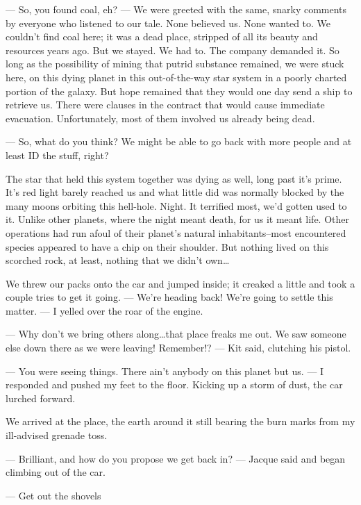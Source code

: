 \sepline

--- So, you found coal, eh? --- We were greeted with the same, snarky comments by everyone who listened to our tale. None believed us. None wanted to. We couldn't find coal here; it was a dead place, stripped of all its beauty and resources years ago. But we stayed. We had to. The company demanded it. So long as the possibility of mining that putrid substance remained, we were stuck here, on this dying planet in this out-of-the-way star system in a poorly charted portion of the galaxy. But hope remained that they would one day send a ship to retrieve us. There were clauses in the contract that would cause immediate evacuation. Unfortunately, most of them involved us already being dead.

--- So, what do you think? We might be able to go back with more people and at least ID the stuff, right?

The star that held this system together was dying as well, long past it's prime. It's red light barely reached us and what little did was normally blocked by the many moons orbiting this hell-hole. Night. It terrified most, we'd gotten used to it. Unlike other planets, where the night meant death, for us it meant life. Other operations had run afoul of their planet's natural inhabitants--most encountered species appeared to have a chip on their shoulder. But nothing lived on this scorched rock, at least, nothing that we didn't own\ldots{}

\sepline

We threw our packs onto the car and jumped inside; it creaked a little and took a couple tries to get it going. --- We're heading back! We're going to settle this matter. --- I yelled over the roar of the engine.

--- Why don't we bring others along\ldots{}that place freaks me out. We saw someone else down there as we were leaving! Remember!? --- Kit said, clutching his pistol.

--- You were seeing things. There ain't anybody on this planet but us. --- I responded and pushed my feet to the floor. Kicking up a storm of dust, the car lurched forward.

\sepline

We arrived at the place, the earth around it still bearing the burn marks from my ill-advised grenade toss.

--- Brilliant, and how do you propose we get back in? --- Jacque said and began climbing out of the car.

--- Get out the shovels

